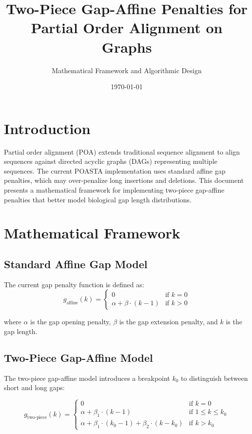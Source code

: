 \documentclass[11pt]{article}
\title{Two-Piece Gap-Affine Penalties for Partial Order Alignment on Graphs}
\author{Mathematical Framework and Algorithmic Design}
\date{\today}
\begin{document}
\maketitle

\section{Introduction}

Partial order alignment (POA) extends traditional sequence alignment to align sequences against directed acyclic graphs (DAGs) representing multiple sequences. The current POASTA implementation uses standard affine gap penalties, which may over-penalize long insertions and deletions. This document presents a mathematical framework for implementing two-piece gap-affine penalties that better model biological gap length distributions.

\section{Mathematical Framework}

\subsection{Standard Affine Gap Model}

The current gap penalty function is defined as:
\begin{equation}
g_{\text{affine}}(k) = \begin{cases} 
0 & \text{if } k = 0 \\
\alpha + \beta \cdot (k-1) & \text{if } k > 0
\end{cases}
\end{equation}

where $\alpha$ is the gap opening penalty, $\beta$ is the gap extension penalty, and $k$ is the gap length.

\subsection{Two-Piece Gap-Affine Model}

The two-piece gap-affine model introduces a breakpoint $k_0$ to distinguish between short and long gaps:

\begin{equation}
g_{\text{two-piece}}(k) = \begin{cases}
0 & \text{if } k = 0 \\
\alpha + \beta_1 \cdot (k-1) & \text{if } 1 \leq k \leq k_0 \\
\alpha + \beta_1 \cdot (k_0-1) + \beta_2 \cdot (k-k_0) & \text{if } k > k_0
\end{cases}
\end{equation}
\end{document}
